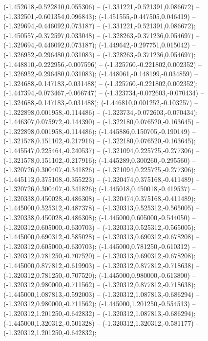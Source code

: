  (-1.452618,-0.522810,0.055306) -- (-1.331221,-0.521391,0.086672) -- (-1.332501,-0.601354,0.096843);
 (-1.451555,-0.447505,0.046419) -- (-1.329694,-0.446092,0.073187) -- (-1.331221,-0.521391,0.086672);
 (-1.450557,-0.372597,0.033048) -- (-1.328263,-0.371236,0.054697) -- (-1.329694,-0.446092,0.073187);
 (-1.449642,-0.297751,0.015042) -- (-1.326952,-0.296480,0.031083) -- (-1.328263,-0.371236,0.054697);
 (-1.448810,-0.222956,-0.007596) -- (-1.325760,-0.221802,0.002352) -- (-1.326952,-0.296480,0.031083);
 (-1.448061,-0.148199,-0.034859) -- (-1.324688,-0.147183,-0.031488) -- (-1.325760,-0.221802,0.002352);
 (-1.447394,-0.073467,-0.066747) -- (-1.323734,-0.072603,-0.070434) -- (-1.324688,-0.147183,-0.031488);
 (-1.446810,0.001252,-0.103257) -- (-1.322898,0.001958,-0.114486) -- (-1.323734,-0.072603,-0.070434);
 (-1.446307,0.075972,-0.144390) -- (-1.322180,0.076520,-0.163645) -- (-1.322898,0.001958,-0.114486);
 (-1.445886,0.150705,-0.190149) -- (-1.321578,0.151102,-0.217916) -- (-1.322180,0.076520,-0.163645);
 (-1.445547,0.225464,-0.240537) -- (-1.321094,0.225725,-0.277306) -- (-1.321578,0.151102,-0.217916);
 (-1.445289,0.300260,-0.295560) -- (-1.320726,0.300407,-0.341826) -- (-1.321094,0.225725,-0.277306);
 (-1.445113,0.375108,-0.355223) -- (-1.320474,0.375168,-0.411489) -- (-1.320726,0.300407,-0.341826);
 (-1.445018,0.450018,-0.419537) -- (-1.320338,0.450028,-0.486308) -- (-1.320474,0.375168,-0.411489);
 (-1.445000,0.525312,-0.487378) -- (-1.320313,0.525312,-0.565005) -- (-1.320338,0.450028,-0.486308);
 (-1.445000,0.605000,-0.544050) -- (-1.320312,0.605000,-0.630703) -- (-1.320313,0.525312,-0.565005);
 (-1.445000,0.690312,-0.585028) -- (-1.320313,0.690312,-0.678208) -- (-1.320312,0.605000,-0.630703);
 (-1.445000,0.781250,-0.610312) -- (-1.320312,0.781250,-0.707520) -- (-1.320313,0.690312,-0.678208);
 (-1.445000,0.877812,-0.619903) -- (-1.320312,0.877812,-0.718638) -- (-1.320312,0.781250,-0.707520);
 (-1.445000,0.980000,-0.613800) -- (-1.320312,0.980000,-0.711562) -- (-1.320312,0.877812,-0.718638);
 (-1.445000,1.087813,-0.592003) -- (-1.320312,1.087813,-0.686294) -- (-1.320312,0.980000,-0.711562);
 (-1.445000,1.201250,-0.554513) -- (-1.320312,1.201250,-0.642832) -- (-1.320312,1.087813,-0.686294);
 (-1.445000,1.320312,-0.501328) -- (-1.320312,1.320312,-0.581177) -- (-1.320312,1.201250,-0.642832);
